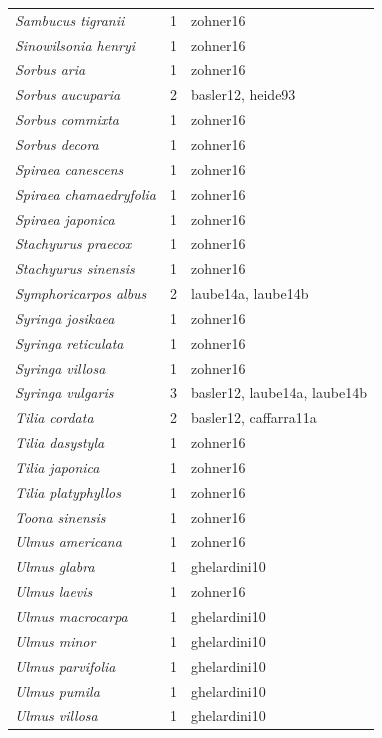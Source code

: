 \documentclass{article}
\begin{document}
\begin{footnotesize}
\begin{longtable}{p{}p{}p{}}
  \textit{Sambucus tigranii} &   1 & zohner16 \\ 
  \textit{Sinowilsonia henryi} &   1 & zohner16 \\ 
  \textit{Sorbus aria} &   1 & zohner16 \\ 
  \textit{Sorbus aucuparia} &   2 & basler12, heide93 \\ 
  \textit{Sorbus commixta} &   1 & zohner16 \\ 
  \textit{Sorbus decora} &   1 & zohner16 \\ 
  \textit{Spiraea canescens} &   1 & zohner16 \\ 
  \textit{Spiraea chamaedryfolia} &   1 & zohner16 \\ 
  \textit{Spiraea japonica} &   1 & zohner16 \\ 
  \textit{Stachyurus praecox} &   1 & zohner16 \\ 
  \textit{Stachyurus sinensis} &   1 & zohner16 \\ 
  \textit{Symphoricarpos albus} &   2 & laube14a, laube14b \\ 
  \textit{Syringa josikaea} &   1 & zohner16 \\ 
  \textit{Syringa reticulata} &   1 & zohner16 \\ 
  \textit{Syringa villosa} &   1 & zohner16 \\ 
  \textit{Syringa vulgaris} &   3 & basler12, laube14a, laube14b \\ 
  \textit{Tilia cordata} &   2 & basler12, caffarra11a \\ 
  \textit{Tilia dasystyla} &   1 & zohner16 \\ 
  \textit{Tilia japonica} &   1 & zohner16 \\ 
  \textit{Tilia platyphyllos} &   1 & zohner16 \\ 
  \textit{Toona sinensis} &   1 & zohner16 \\ 
  \textit{Ulmus americana} &   1 & zohner16 \\ 
  \textit{Ulmus glabra} &   1 & ghelardini10 \\ 
  \textit{Ulmus laevis} &   1 & zohner16 \\ 
  \textit{Ulmus macrocarpa} &   1 & ghelardini10 \\ 
  \textit{Ulmus minor} &   1 & ghelardini10 \\ 
  \textit{Ulmus parvifolia} &   1 & ghelardini10 \\ 
  \textit{Ulmus pumila} &   1 & ghelardini10 \\ 
  \textit{Ulmus villosa} &   1 & ghelardini10 \\ 

\end{longtable}
\end{footnotesize}
\end{document}
